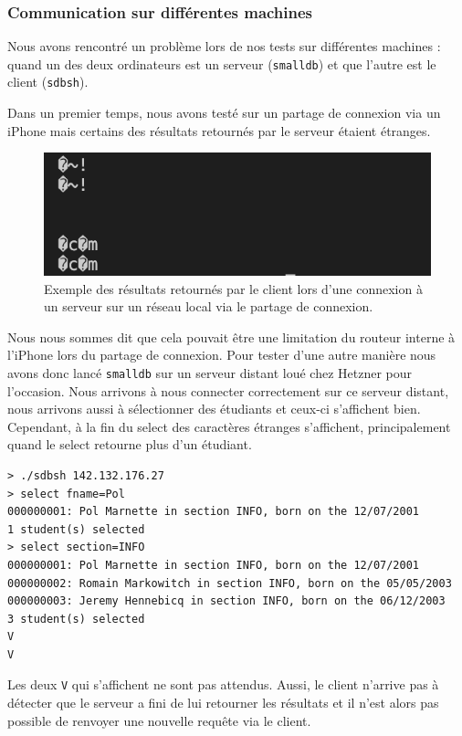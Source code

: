 \documentclass[utf8]{article}
\begin{document}
\subsubsection{Communication sur différentes machines}

Nous avons rencontré un problème lors de nos tests sur différentes machines : quand un des deux ordinateurs est un serveur (\texttt{smalldb}) et que l'autre est le client (\texttt{sdbsh}).

Dans un premier temps, nous avons testé sur un partage de connexion via un iPhone mais certains des résultats retournés par le serveur étaient étranges.

\begin{figure}[ht]
	\includegraphics[scale=0.6]{assets/char-iphone.png}
	\caption{Exemple des résultats retournés par le client lors d'une connexion à un serveur sur un réseau local via le partage de connexion.}
	\label{fig:char_iphone}
\end{figure}

Nous nous sommes dit que cela pouvait être une limitation du routeur interne à l'iPhone lors du partage de connexion. Pour tester d'une autre manière nous avons donc lancé \texttt{smalldb} sur un serveur distant loué chez Hetzner pour l'occasion. Nous arrivons à nous connecter correctement sur ce serveur distant, nous arrivons aussi à sélectionner des étudiants et ceux-ci s'affichent bien. Cependant, à la fin du select des caractères étranges s'affichent, principalement quand le select retourne plus d'un étudiant.

\begin{lstlisting}
> ./sdbsh 142.132.176.27
> select fname=Pol
000000001: Pol Marnette in section INFO, born on the 12/07/2001
1 student(s) selected
> select section=INFO
000000001: Pol Marnette in section INFO, born on the 12/07/2001
000000002: Romain Markowitch in section INFO, born on the 05/05/2003
000000003: Jeremy Hennebicq in section INFO, born on the 06/12/2003
3 student(s) selected
V
V
\end{lstlisting}

Les deux \texttt{V} qui s'affichent ne sont pas attendus. Aussi, le client n'arrive pas à détecter que le serveur a fini de lui retourner les résultats et il n'est alors pas possible de renvoyer une nouvelle requête via le client.
\end{document}
